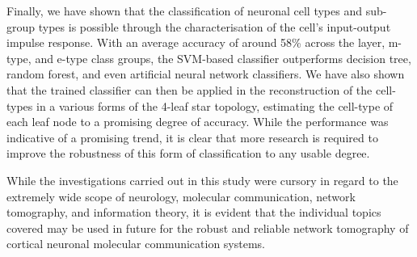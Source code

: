 \par

Finally, we have shown that the classification of neuronal cell types and sub-group types is possible through the characterisation of the cell's input-output impulse response. With an average accuracy of around 58\% across the layer, m-type, and e-type class groups, the SVM-based classifier outperforms decision tree, random forest, and even artificial neural network classifiers. We have also shown that the trained classifier can then be applied in the reconstruction of the cell-types in a various forms of the 4-leaf star topology, estimating the cell-type of each leaf node to a promising degree of accuracy. While the performance was indicative of a promising trend, it is clear that more research is required to improve the robustness of this form of classification to any usable degree.

\par

While the investigations carried out in this study were cursory in regard to the extremely wide scope of neurology, molecular communication, network tomography, and information theory, it is evident that the individual topics covered may be used in future for the robust and reliable network tomography of cortical neuronal molecular communication systems.